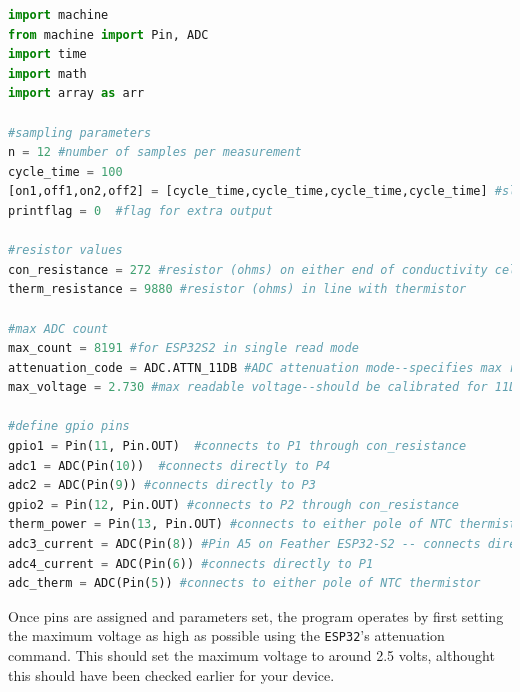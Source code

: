 \begin{lstlisting}[language=Python]
import machine
from machine import Pin, ADC
import time
import math
import array as arr

#sampling parameters
n = 12 #number of samples per measurement
cycle_time = 100
[on1,off1,on2,off2] = [cycle_time,cycle_time,cycle_time,cycle_time] #sleep time in microseconds
printflag = 0  #flag for extra output

#resistor values 
con_resistance = 272 #resistor (ohms) on either end of conductivity cell
therm_resistance = 9880 #resistor (ohms) in line with thermistor

#max ADC count
max_count = 8191 #for ESP32S2 in single read mode
attenuation_code = ADC.ATTN_11DB #ADC attenuation mode--specifies max readable voltage
max_voltage = 2.730 #max readable voltage--should be calibrated for 11DB atten

#define gpio pins
gpio1 = Pin(11, Pin.OUT)  #connects to P1 through con_resistance
adc1 = ADC(Pin(10))  #connects directly to P4
adc2 = ADC(Pin(9)) #connects directly to P3
gpio2 = Pin(12, Pin.OUT) #connects to P2 through con_resistance
therm_power = Pin(13, Pin.OUT) #connects to either pole of NTC thermistor
adc3_current = ADC(Pin(8)) #Pin A5 on Feather ESP32-S2 -- connects directly to P2
adc4_current = ADC(Pin(6)) #connects directly to P1
adc_therm = ADC(Pin(5)) #connects to either pole of NTC thermistor

\end{lstlisting}

Once pins are assigned and parameters set, the program operates by first setting the maximum \adc voltage as high as possible using the \texttt{ESP32}'s attenuation command.  This should set the maximum voltage to around 2.5 volts, althought this should have been checked earlier for your device.

